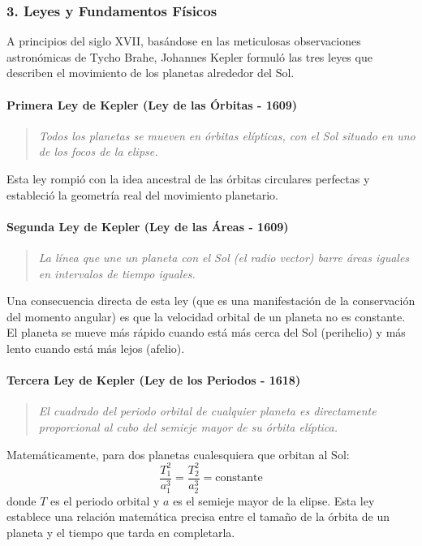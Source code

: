 \subsubsection*{3. Leyes y Fundamentos Físicos}
A principios del siglo XVII, basándose en las meticulosas observaciones astronómicas de Tycho Brahe, Johannes Kepler formuló las tres leyes que describen el movimiento de los planetas alrededor del Sol.

\paragraph*{Primera Ley de Kepler (Ley de las Órbitas - 1609)}
\begin{quote}
    \textit{Todos los planetas se mueven en órbitas elípticas, con el Sol situado en uno de los focos de la elipse.}
\end{quote}
Esta ley rompió con la idea ancestral de las órbitas circulares perfectas y estableció la geometría real del movimiento planetario.

\paragraph*{Segunda Ley de Kepler (Ley de las Áreas - 1609)}
\begin{quote}
    \textit{La línea que une un planeta con el Sol (el radio vector) barre áreas iguales en intervalos de tiempo iguales.}
\end{quote}
Una consecuencia directa de esta ley (que es una manifestación de la conservación del momento angular) es que la velocidad orbital de un planeta no es constante. El planeta se mueve más rápido cuando está más cerca del Sol (perihelio) y más lento cuando está más lejos (afelio).

\paragraph*{Tercera Ley de Kepler (Ley de los Periodos - 1618)}
\begin{quote}
    \textit{El cuadrado del periodo orbital de cualquier planeta es directamente proporcional al cubo del semieje mayor de su órbita elíptica.}
\end{quote}
Matemáticamente, para dos planetas cualesquiera que orbitan al Sol:
$$ \frac{T_1^2}{a_1^3} = \frac{T_2^2}{a_2^3} = \text{constante} $$
donde $T$ es el periodo orbital y $a$ es el semieje mayor de la elipse. Esta ley establece una relación matemática precisa entre el tamaño de la órbita de un planeta y el tiempo que tarda en completarla.

